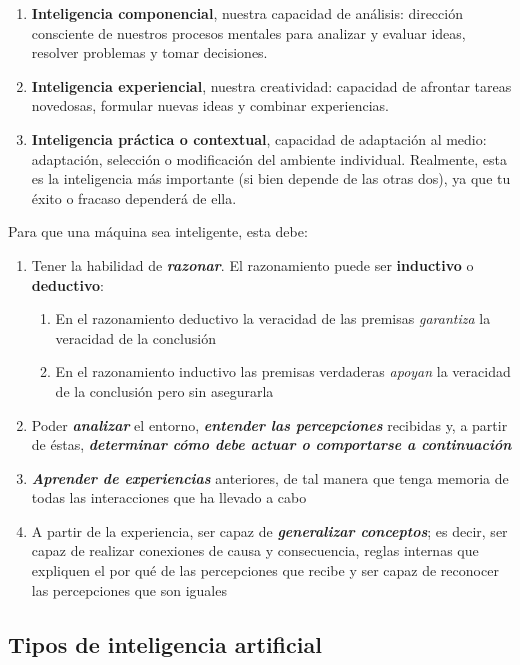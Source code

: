 \begin{enumerate}
    \item \textbf{Inteligencia componencial}, nuestra capacidad de análisis: dirección consciente de nuestros procesos mentales para analizar y evaluar ideas, resolver problemas y tomar decisiones.
    \item \textbf{Inteligencia experiencial}, nuestra creatividad: capacidad de afrontar tareas novedosas, formular nuevas ideas y combinar experiencias.
    \item \textbf{Inteligencia práctica o contextual}, capacidad de adaptación al medio: adaptación, selección o modificación del ambiente individual. Realmente, esta es la inteligencia más importante (si bien depende de las otras dos), ya que tu éxito o fracaso  dependerá de ella. 
\end{enumerate}


Para que una máquina sea inteligente, esta debe: 

\begin{enumerate}
    \item Tener la habilidad de \textbf{\textit{razonar}}. El razonamiento puede ser \textbf{inductivo} o \textbf{deductivo}:
        \begin{enumerate}
            \item En el razonamiento deductivo la veracidad de las premisas \textit{garantiza} la veracidad de la conclusión
            \item En el razonamiento inductivo las premisas verdaderas \textit{apoyan} la veracidad de la conclusión pero sin asegurarla
        \end{enumerate}
    \item Poder \textbf{\textit{analizar}} el entorno, \textbf{\textit{entender las percepciones}} recibidas y, a partir de éstas, \textbf{\textit{determinar cómo debe actuar o comportarse a continuación}}
    \item \textbf{\textit{Aprender de experiencias}} anteriores, de tal manera que tenga memoria de todas las interacciones que ha llevado a cabo 
    \item A partir de la experiencia, ser capaz de \textbf{\textit{generalizar conceptos}}; es decir, ser capaz de realizar conexiones de causa y consecuencia, reglas internas que expliquen el por qué de las percepciones que recibe y ser capaz de reconocer las percepciones que son iguales
\end{enumerate}

\subsection{Tipos de inteligencia artificial}

